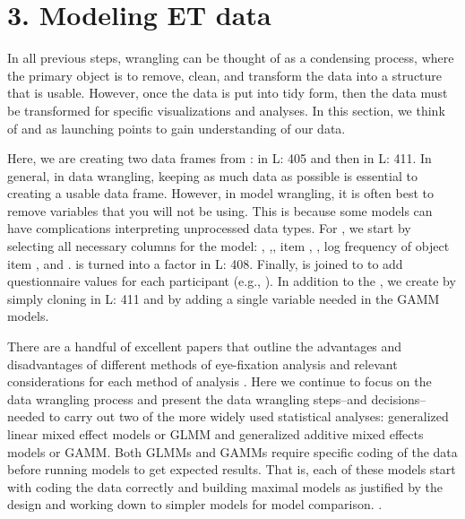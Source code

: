 \section{3. Modeling ET data}

In all previous steps, wrangling can be thought of as a condensing process, where the primary object is to remove, clean, and transform the data into a structure that is usable. However, once the data is put into tidy form, then the data must be transformed for specific visualizations and analyses. In this section, we think of  and  as launching points to gain understanding of our data. 

 Here, we are creating two data frames from :  in L: 405 and then  in L: 411. In general, in data wrangling, keeping as much data as possible is essential to creating a usable data frame. However, in model wrangling, it is often best to remove variables that you will not be using. This is because some models can have complications interpreting unprocessed data types. For , we start by selecting all necessary columns for the model: , ,, item , , log frequency of object item , and  .  is turned into a factor in L: 408. Finally,  is joined to  to add questionnaire values for each participant (e.g., ). In addition to the , we create  by simply cloning  in L: 411 and by adding a single variable needed in the GAMM models.



There are a handful of excellent papers that outline the advantages and disadvantages of different methods of eye-fixation analysis and relevant considerations for each method of analysis \parencite{Ito_Knoeferle_2022,Mirman_Dixon_Magnuson_2008,McMurray_2023,Barr_2008}. Here we continue to focus on the data wrangling process and present the data wrangling steps--and decisions--needed to carry out two of the more widely used statistical analyses: generalized linear mixed effect models or GLMM and generalized additive mixed effects models or GAMM. Both GLMMs and GAMMs require specific coding of the data before running models to get expected results. That is, each of these models start with coding the data correctly and building maximal models as justified by the design and working down to simpler models for model comparison. \parencite{Barr_Levy_Scheepers_Tily_2013}.



